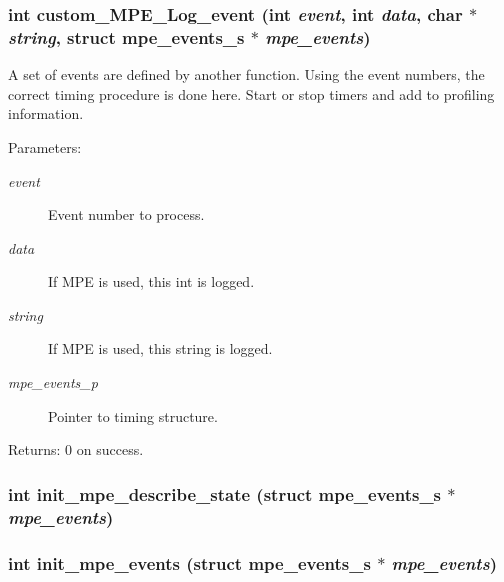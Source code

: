 \subsubsection{\setlength{\rightskip}{0pt plus 5cm}int custom\_\-MPE\_\-Log\_\-event (int {\em event}, int {\em data}, char $\ast$ {\em string}, struct \bf{mpe\_\-events\_\-s} $\ast$ {\em mpe\_\-events})}\label{mpe__init_8h_ca0bad04081205f395d4fbb25624bb0f}


A set of events are defined by another function. Using the event numbers, the correct timing procedure is done here. Start or stop timers and add to profiling information.

\begin{Desc}
\item[Parameters:]
\begin{description}
\item[{\em event}]Event number to process. \item[{\em data}]If MPE is used, this int is logged. \item[{\em string}]If MPE is used, this string is logged. \item[{\em mpe\_\-events\_\-p}]Pointer to timing structure. \end{description}
\end{Desc}
\begin{Desc}
\item[Returns:]0 on success. \end{Desc}
\subsubsection{\setlength{\rightskip}{0pt plus 5cm}int init\_\-mpe\_\-describe\_\-state (struct \bf{mpe\_\-events\_\-s} $\ast$ {\em mpe\_\-events})}\label{mpe__init_8h_ca607055c9c3a4f21145349df1b3ac04}


\subsubsection{\setlength{\rightskip}{0pt plus 5cm}int init\_\-mpe\_\-events (struct \bf{mpe\_\-events\_\-s} $\ast$ {\em mpe\_\-events})}\label{mpe__init_8h_96fb9612d0256b13c9d195ff01412f41}


